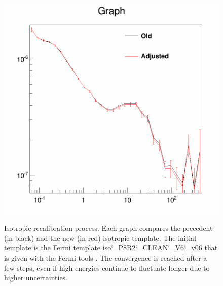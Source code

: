 \begin{figure}[H]
\begin{minipage}[h]{0.45\textwidth}
 	\subcaption{}
  	\label{app:app_iso_process_3}
  \end{minipage}
  \hfill
  \begin{minipage}[h]{0.45\textwidth}
  	\centering
	\includegraphics[width=1\linewidth]{pic/method/app_iso_process_4.png}
  	\subcaption{}
  	\label{app:app_iso_process_4}
  \end{minipage}
  \caption[Isotropic template convergence.]{Isotropic recalibration process. Each graph compares the precedent (in black) and the new (in red) isotropic template. The initial template is the Fermi template iso\char`_P8R2\char`_CLEAN\char`_V6\char`_v06 that is given with the Fermi tools \cite{FermiTools}. The convergence is reached after a few steps, even if high energies continue to fluctuate longer due to higher uncertainties.}
  \label{app:app_iso_process}
\end{figure}





